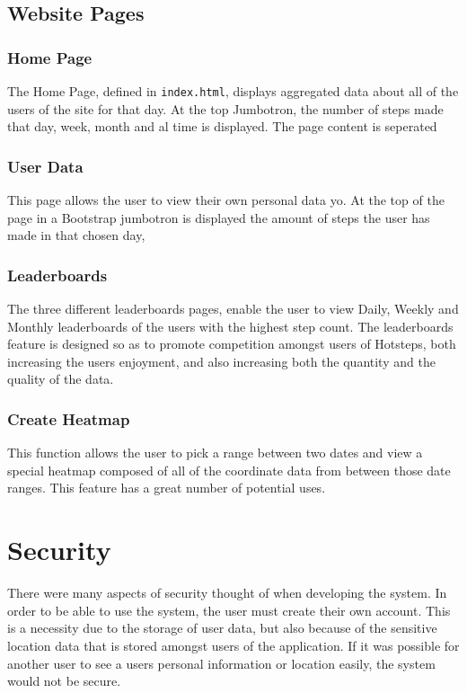 \documentclass{l4proj}
\begin{document}
\subsection{Website Pages}

\subsubsection{Home Page}

The Home Page, defined in \texttt{index.html}, displays aggregated data about all of the users of the site for that day. At the top Jumbotron, the number of steps made that day, week, month and al time is displayed. The page content is seperated 

\subsubsection{User Data}

This page allows the user to view their own personal data yo.  At the top of the page in a Bootstrap jumbotron is displayed the amount of steps the user has made in that chosen day, 
\subsubsection{Leaderboards}

The three different leaderboards pages, enable the user to view Daily, Weekly and Monthly leaderboards of the users with the highest step count. The leaderboards feature is designed so as to promote competition amongst users of Hotsteps, both increasing the users enjoyment, and also increasing both the quantity and the quality of the data.

\subsubsection{Create Heatmap}

This function allows the user to pick a range between two dates and view a special heatmap composed of all of the coordinate data from between those date ranges. This feature has a great number of potential uses.

\section{Security}

There were many aspects of security thought of when developing the system. In order to be able to use the system, the user must create their own account. This is a necessity due to the storage of user data, but also because of the sensitive location data that is stored amongst users of the application. If it was possible for another user to see a users personal information or location easily, the system would not be secure.
\end{document}
